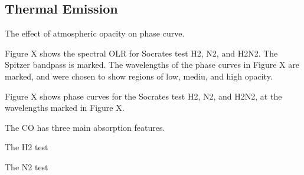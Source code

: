 %
%
%
%
%

\subsection{Thermal Emission}

The effect of atmospheric opacity on phase curve.

Figure X shows the spectral OLR for Socrates test H2, N2, and H2N2. The Spitzer bandpass is marked. The wavelengths of the phase curves in Figure X are marked, and were chosen to show regions of low, mediu, and high opacity.

Figure X shows phase curves for the Socrates test H2, N2, and H2N2, at the wavelengths marked in Figure X.

The CO has three main absorption features.

The H2 test

The N2 test


